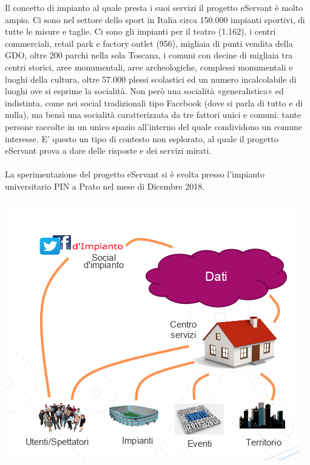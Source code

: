 Il concetto di impianto al quale presta i suoi servizi il progetto eServant è molto ampio.
Ci sono nel settore dello sport in Italia circa 150.000 impianti sportivi, di tutte le misure e taglie. Ci sono gli impianti per il teatro (1.162), i centri commerciali, retail park e factory outlet (956), migliaia di punti vendita della GDO, oltre 200 parchi nella sola Toscana, i comuni con decine di migliaia tra centri storici, aree monumentali, aree archeologiche, complessi monumentali e luoghi della cultura, oltre 57.000 plessi scolastici ed un numero incalcolabile di luoghi ove si esprime la socialità.
Non però una socialità «generalistica» ed indistinta, come nei social tradizionali tipo Facebook (dove si parla di tutto e di nulla), ma bensì una socialità caratterizzata da tre fattori unici e comuni:
tante persone
raccolte in un unico spazio
all’interno del quale condividono un comune interesse.
E’ questo un tipo di contesto non esplorato, al quale il progetto eServant prova a dare delle risposte e dei servizi mirati.
\paragraph{}

La sperimentazione del progetto eServant si è svolta presso l’impianto universitario PIN a Prato nel mese di Dicembre 2018.
\paragraph{}

\includegraphics[scale=0.8]{img/cap1/eservant}\\

